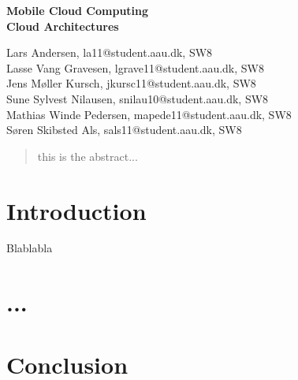 \documentclass[12pt,a4paper]{article}
\begin{document}
\begin{center}
\bigskip\bigskip
{\Large\bf Mobile Cloud Computing\\}
\bigskip
{\Large\bf Cloud Architectures}
\bigskip\bigskip


Lars Andersen, la11@student.aau.dk, SW8\\
Lasse Vang Gravesen, lgrave11@student.aau.dk, SW8\\
Jens Møller Kursch, jkursc11@student.aau.dk, SW8\\
Sune Sylvest Nilausen, snilau10@student.aau.dk, SW8\\
Mathias Winde Pedersen, mapede11@student.aau.dk, SW8\\
Søren Skibsted Als, sals11@student.aau.dk, SW8 %

\bigskip
\begin{abstract}
this is the abstract...
\end{abstract}

\thispagestyle{empty}
\end{center}


\titlepage

\thispagestyle{plain}


\section{Introduction}
Blablabla \citep{misc:mobilecloudcomputing}

\section{...}



\section{Conclusion}

\newpage


\label{bib:mybiblio}
\end{document}
